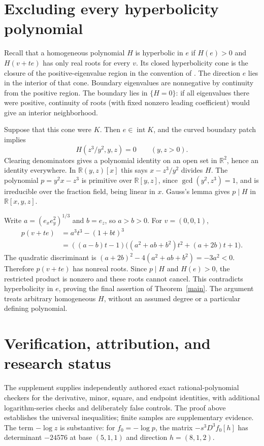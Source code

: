 \documentclass[11pt]{article}
\newcommand{\R}{\mathbb R}
\newcommand{\inter}{\operatorname{int}}
\begin{document}
\section{Excluding every hyperbolicity polynomial}
Recall that a homogeneous polynomial $H$ is hyperbolic in $e$ if
$H(e)>0$ and $H(v+te)$ has only real roots for every $v$.
Its closed hyperbolicity cone is the closure of the positive-eigenvalue
region in the convention of \cite{T}. The direction $e$ lies in the
interior of that cone. Boundary eigenvalues are nonnegative by continuity
from the positive region. The boundary lies in $\{H=0\}$: if all eigenvalues
there were positive, continuity of roots (with fixed
nonzero leading coefficient) would give an interior neighborhood.

Suppose that this cone were $K$. Then $e\in\inter K$, and the curved
boundary patch implies
\[
 H(z^3/y^2,y,z)=0\qquad(y,z>0).
\]
Clearing denominators gives a polynomial identity on an open set in
$\R^2$, hence an identity everywhere. In $\R(y,z)[x]$ this says
$x-z^3/y^2$ divides $H$. The polynomial $p=y^2x-z^3$ is primitive
over $\R[y,z]$, since $\gcd(y^2,z^3)=1$, and is irreducible over the
fraction field, being linear in $x$. Gauss's lemma gives $p\mid H$
in $\R[x,y,z]$.

Write $a=(e_xe_y^2)^{1/3}$ and $b=e_z$, so $a>b>0$. For $v=(0,0,1)$,
\begin{align*}
 p(v+te)&=a^3t^3-(1+bt)^3\\
 &=((a-b)t-1)\bigl((a^2+ab+b^2)t^2+(a+2b)t+1\bigr).
\end{align*}
The quadratic discriminant is $(a+2b)^2-4(a^2+ab+b^2)=-3a^2<0$.
Therefore $p(v+te)$ has nonreal roots. Since $p\mid H$ and $H(e)>0$,
the restricted product is nonzero and these roots cannot cancel.
This contradicts hyperbolicity in $e$, proving the final assertion of
Theorem~\ref{main}. The argument treats arbitrary homogeneous $H$,
without an assumed degree or a particular defining polynomial.

\section*{Verification, attribution, and research status}
The supplement supplies independently authored exact rational-polynomial
checkers for the derivative, minor, square, and endpoint identities, with
additional logarithm-series checks and deliberately false controls.
The proof above establishes the universal inequalities; finite samples
are supplementary evidence. The term $-\log z$ is substantive: for
$f_0=-\log p$, the matrix $-s^3D^3f_0[h]$ has determinant $-24576$
at base $(5,1,1)$ and direction $h=(8,1,2)$.
\end{document}
